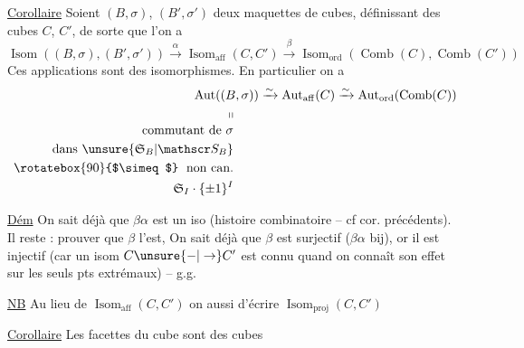 
\uline{Corollaire} Soient $(B,\sigma)$, $(B',\sigma')$ deux  maquettes de cubes,  définissant des cubes $C$, $C'$, de sorte que l'on a
\[
\operatorname{Isom}((B,\sigma),(B',\sigma'))\xrightarrow{\alpha}
\operatorname{Isom}_{\mathrm{aff}}(C,C')\xrightarrow{\beta}
\operatorname{Isom}_{\mathrm{ord}}(\operatorname{Comb}(C),\operatorname{Comb}(C'))
\]
Ces applications sont des isomorphismes. En particulier on a
\[
\begin{aligned}
\operatorname{Aut}((B,\sigma))&\xrightarrow{\sim}\operatorname{Aut}_{\mathrm{aff}}(C)\xrightarrow{\sim}\operatorname{Aut}_{\mathrm{ord}}(\operatorname{Comb}(C))\\
\shortparallel\qquad&\\[-2pt]
\text{commutant de }\sigma\qquad&\\
\text{dans }\unsure{\mathfrak S_B|\mathscr S_B}\qquad&\\
\mathrel{\rotatebox{90}{$\simeq$}}\ \text{non can.}\qquad&\\
\mathfrak S_I\cdot\{\pm1\}^{I}\qquad&
\end{aligned}
\]

\uline{Dém} On sait déjà que $\beta\alpha$ est un iso (histoire combinatoire -- cf cor. précédents). Il reste : prouver que $\beta$ l'est, On  sait déjà que $\beta$ est surjectif ($\beta\alpha$ bij), or il est injectif (car un isom $C\unsure{-|\to} C'$ est connu quand on connaît son effet sur les seuls pts extrémaux) -- g.g.

\uline{NB} Au lieu de $\operatorname{Isom}_{\mathrm{aff}}(C,C')$ on  aussi d'écrire $\operatorname{Isom}_{\mathrm{proj}}(C,C')$

\uline{Corollaire} Les facettes du cube sont des cubes
